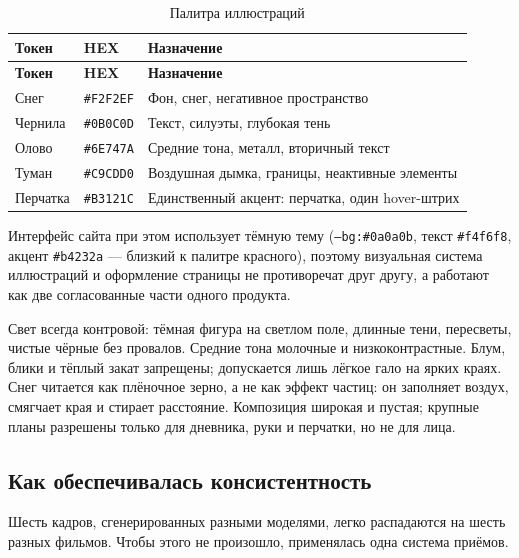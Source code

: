 \documentclass[12pt, a4paper]{article}
\begin{document}
\begin{small}
\setlength{\tabcolsep}{4pt}
\begin{longtable}{@{}L{3.6cm}L{2.6cm}L{9.2cm}@{}}
\caption{Палитра иллюстраций}\label{tab:palette}\\
\toprule
\textbf{Токен} & \textbf{HEX} & \textbf{Назначение} \\
\midrule
\endfirsthead
\toprule
\textbf{Токен} & \textbf{HEX} & \textbf{Назначение} \\
\midrule
\endhead
\bottomrule
\endlastfoot
Снег & \texttt{\#F2F2EF} & Фон, снег, негативное пространство \\
\addlinespace
Чернила & \texttt{\#0B0C0D} & Текст, силуэты, глубокая тень \\
\addlinespace
Олово & \texttt{\#6E747A} & Средние тона, металл, вторичный текст \\
\addlinespace
Туман & \texttt{\#C9CDD0} & Воздушная дымка, границы, неактивные элементы \\
\addlinespace
Перчатка & \texttt{\#B3121C} & Единственный акцент: перчатка, один hover-штрих \\
\end{longtable}
\end{small}

Интерфейс сайта при этом использует тёмную тему (\texttt{--bg:\#0a0a0b}, текст \texttt{\#f4f6f8}, акцент \texttt{\#b4232a} --- близкий к палитре красного), поэтому визуальная система иллюстраций и оформление страницы не противоречат друг другу, а работают как две согласованные части одного продукта.

Свет всегда контровой: тёмная фигура на светлом поле, длинные тени, пересветы, чистые чёрные без провалов. Средние тона молочные и низкоконтрастные. Блум, блики и тёплый закат запрещены; допускается лишь лёгкое гало на ярких краях. Снег читается как плёночное зерно, а не как эффект частиц: он заполняет воздух, смягчает края и стирает расстояние. Композиция широкая и пустая; крупные планы разрешены только для дневника, руки и перчатки, но не для лица.

\subsection{Как обеспечивалась консистентность}
Шесть кадров, сгенерированных разными моделями, легко распадаются на шесть разных фильмов. Чтобы этого не произошло, применялась одна система приёмов.
\end{document}
